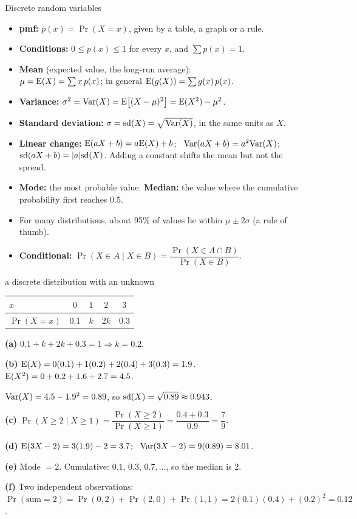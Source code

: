 \begin{keyres}{Discrete random variables}
\begin{cols}
\begin{itemize}
  \item \textbf{pmf:} $p(x)=\Pr(X=x)$, given by a table, a graph or a rule.
  \item \textbf{Conditions:} $0\le p(x)\le1$ for every $x$, and $\sum p(x)=1$.
  \item \textbf{Mean} (expected value, the long-run average):\\ $\mu=\mathrm{E}(X)=\sum x\,p(x)$; in general $\mathrm{E}(g(X))=\sum g(x)\,p(x)$.
  \item \textbf{Variance:} $\sigma^2=\mathrm{Var}(X)=\mathrm{E}\big[(X-\mu)^2\big]=\mathrm{E}(X^2)-\mu^2$.
  \item \textbf{Standard deviation:} $\sigma=\mathrm{sd}(X)=\sqrt{\mathrm{Var}(X)}$, in the same units as $X$.
\end{itemize}
\nextcol
\begin{itemize}
  \item \textbf{Linear change:} $\mathrm{E}(aX+b)=a\mathrm{E}(X)+b$; \ $\mathrm{Var}(aX+b)=a^2\mathrm{Var}(X)$; \ $\mathrm{sd}(aX+b)=|a|\mathrm{sd}(X)$. Adding a constant shifts the mean but not the spread.
  \item \textbf{Mode:} the most probable value. \textbf{Median:} the value where the cumulative probability first reaches $0.5$.
  \item For many distributions, about 95\% of values lie within $\mu\pm2\sigma$ (a rule of thumb).
  \item \textbf{Conditional:} $\Pr(X\in A\mid X\in B)=\dfrac{\Pr(X\in A\cap B)}{\Pr(X\in B)}$.
\end{itemize}
\end{cols}
\end{keyres}

\begin{example}{a discrete distribution with an unknown \byhand}
\begin{tabular}{@{}l|cccc@{}}
$x$ & $0$ & $1$ & $2$ & $3$\\ \hline
$\Pr(X=x)$ & $0.1$ & $k$ & $2k$ & $0.3$
\end{tabular}\quad
\textbf{(a)} $0.1+k+2k+0.3=1\Rightarrow k=0.2$.\par
\textbf{(b)} $\mathrm{E}(X)=0(0.1)+1(0.2)+2(0.4)+3(0.3)=1.9$. \ $\mathrm{E}(X^2)=0+0.2+1.6+2.7=4.5$.\par
{} $\mathrm{Var}(X)=4.5-1.9^2=0.89$, so $\mathrm{sd}(X)=\sqrt{0.89}\approx0.943$.\par
\textbf{(c)} $\Pr(X\ge2\mid X\ge1)=\dfrac{\Pr(X\ge2)}{\Pr(X\ge1)}=\dfrac{0.4+0.3}{0.9}=\dfrac79$.\par
\textbf{(d)} $\mathrm{E}(3X-2)=3(1.9)-2=3.7$; \ $\mathrm{Var}(3X-2)=9(0.89)=8.01$.\par
\textbf{(e)} Mode $=2$. Cumulative: $0.1,\,0.3,\,0.7,\dots$, so the median is $2$.\par
\textbf{(f)} Two independent observations: $\Pr(\text{sum}=2)=\Pr(0,2)+\Pr(2,0)+\Pr(1,1)=2(0.1)(0.4)+(0.2)^2=0.12$.
\end{example}

